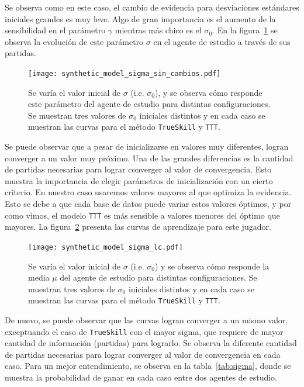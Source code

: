 \documentclass[11pt,twoside,spanish]{report} %
\begin{document}
Se observa como en este caso, el cambio de evidencia para desviaciones est\'andares iniciales grandes es muy leve.
Algo de gran importancia es el aumento de la sensibilidad en el par\'ametro $\gamma$ mientras m\'as chico es el $\sigma_0$.
En la figura~\ref{fig:sigma}  se observa la evoluci\'on de este par\'ametro $\sigma$ en el agente de estudio a trav\'es de sus partidas.


\begin{figure}[H]
	\centering
	\texttt{[image: synthetic\_model\_sigma\_sin\_cambios.pdf]}
    \caption{Se var\'ia el valor inicial de $\sigma$ (i.e. $\sigma_0$), y se observa c\'omo responde este par\'ametro del agente de estudio para distintas configuraciones. Se muestran tres valores de $\sigma_0$ iniciales distintos y en cada caso se muestran las curvas para el m\'etodo \texttt{TrueSkill} y \texttt{TTT}.}
	\label{fig:sigma}
\end{figure}


Se puede observar que a pesar de inicializarse en valores muy diferentes, logran converger a un valor muy pr\'oximo.
Una de las grandes diferencias es la cantidad de partidas necesarias para lograr converger al valor de convergencia.
Esto muestra la importancia de elegir par\'ametros de inicializaci\'on con un cierto criterio.
En nuestro caso usaremos valores mayores al que optimiza la evidencia.
Esto se debe a que cada base de datos puede variar estos valores \'optimos, y por como vimos, el modelo \texttt{TTT} es m\'as sensible a valores menores del \'optimo que mayores.
La figura~\ref{fig:sigma_lc} presenta las curvas de aprendizaje para este jugador.

\begin{figure}[H]
	\centering
	\texttt{[image: synthetic\_model\_sigma\_lc.pdf]}
	\caption{Se var\'ia el valor inicial de $\sigma$ (i.e. $\sigma_0$) y se observa c\'omo responde la media $\mu$ del agente de estudio para distintas configuraciones. Se muestran tres valores de $\sigma_0$ iniciales distintos y en cada caso se muestran las curvas para el m\'etodo \texttt{TrueSkill} y \texttt{TTT}.}
	\label{fig:sigma_lc}
\end{figure}

De nuevo, se puede observar que las curvas logran converger a un mismo valor, exceptuando el caso de \texttt{TrueSkill} con el mayor sigma, que requiere de mayor cantidad de informaci\'on (partidas) para lograrlo.
Se observa la diferente cantidad de partidas necesarias para lograr converger al valor de convergencia en cada caso.
Para un mejor entendimiento, se observa en la tabla~\ref{tab:sigma}, donde se muestra la probabilidad de ganar en cada caso entre dos agentes de estudio.
\end{document}

